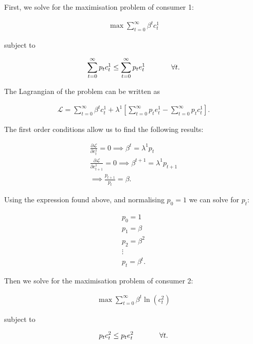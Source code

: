 \documentclass{article}
\begin{document}
First, we solve for the maximisation problem of consumer 1:

\begin{gather*}
    \max \sum^\infty_{t=0} \beta^tc^1_t
\end{gather*}

subject to

\begin{gather*}
  \sum^\infty_{t=0}  p_tc^1_t \leq \sum^\infty_{t=0} p_te_t^1 \mbox{\hspace{0.5in}} \forall t.
\end{gather*}

The Lagrangian of the problem can be written as

\begin{gather*}
    \mathcal{L} = \sum^\infty_{t=0} \beta^tc^1_t + \lambda^1 \left[ \sum^\infty_{t=0} p_te_t^1- \sum^\infty_{t=0} p_tc^1_t \right].
\end{gather*}

The first order conditions allow us to find the following results:

\begin{gather*}
\frac{\partial \mathcal{L}}{\partial c_t^1} = 0 \implies \beta^t = \lambda^1p_t \\
\frac{\partial \mathcal{L}}{\partial c_{t+1}^1} = 0 \implies \beta^{t+1} = \lambda^1p_{t+1} \\
\implies \frac{p_{t+1}}{p_{t}} = \beta.
\end{gather*}

Using the expression found above, and normalising $p_0 = 1$ we can solve for $p_t$:

\begin{gather*}
    p_0 = 1 \\
    p_1 = \beta \\
    p_2 = \beta^2 \\
    \vdots \\
    p_t = \beta^t.
\end{gather*}

Then we solve for the maximisation problem of consumer 2:

\begin{gather*}
    \max \sum^\infty_{t=0} \beta^t\ln(c^2_t)
\end{gather*}

subject to

\begin{gather*}
    p_tc^2_t \leq p_te_t^2 \mbox{\hspace{0.5in}} \forall t.
\end{gather*}
\end{document}
